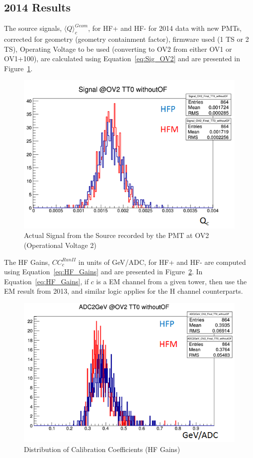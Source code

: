 \subsection{2014 Results}
The source signals, ${\langle{Q}\rangle}^{Geom}_{c}$, for HF+ and HF- for 2014 data with new PMTs, corrected for geometry (geometry containment factor), firmware used (1 TS or 2 TS), Operating Voltage to be used (converting to OV2 from either OV1 or OV1+100), are calculated using Equation~\ref{eq:Sig_OV2} and are presented in Figure~\ref{fig:Signal_@OV2_TT0_withoutOF_FORDN}.
\begin{figure}[htb]
	\begin{center}
		\includegraphics[width=.6\textwidth]{figures/ch_hfcalibration/Signal_@OV2_TT0_withoutOF_FORDN.png}
		\caption{Actual Signal from the Source recorded by the PMT at OV2 (Operational Voltage 2)}
		\label{fig:Signal_@OV2_TT0_withoutOF_FORDN}
	\end{center}
\end{figure}

The HF Gains, ${CC}^{Run II}_{c}$ in units of GeV/ADC, for HF+ and HF- are
computed using Equation~\ref{eq:HF_Gains} and are presented in Figure~\ref{fig:ADC2GeV_OV2_TT0_withoutOF_FORDN}. In Equation~\ref{eq:HF_Gains}, if $c$ is a EM channel from a given tower, then use the EM result from 2013, and similar logic applies for the H channel counterparts.
\begin{figure}[!h]
	\begin{center}
		\includegraphics[width=.6\textwidth]{figures/ch_hfcalibration/ADC2GeV_OV2_TT0_withoutOF_FORDN.png}
		\caption{Distribution of Calibration Coefficients (HF Gains)}
		\label{fig:ADC2GeV_OV2_TT0_withoutOF_FORDN}
	\end{center}
\end{figure}

